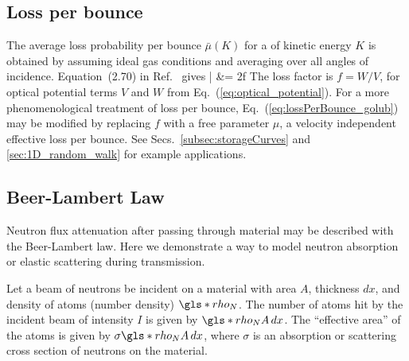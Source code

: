 

\subsection{Loss per bounce}\label{sec:loss_per_bounce}


The average loss probability per bounce $\bar{\mu}(K)$ for a \ucn of kinetic energy $K$ is obtained by assuming ideal gas conditions and averaging over all angles of incidence. Equation~(2.70) in Ref.~\cite{golubUCN} gives
%
\bar{\mu} &= 2f \left[ \frac{V}{K} \sin^{-1}\left( \frac{K}{V}}\right)^{1/2} -\left( \frac{V}{K} - 1 \right)^{1/2} \right]\label{eq:lossPerBounce_golub}
%
The loss factor is $f=W/V$, for optical potential terms $V$ and $W$ from Eq.~(\ref{eq:optical_potential}). For a more phenomenological treatment of loss per bounce, Eq.~(\ref{eq:lossPerBounce_golub}) may be modified by replacing $f$ with a free parameter $\mu$, a velocity independent effective loss per bounce. See Secs.~\ref{subsec:storageCurves} and \ref{sec:1D_random_walk} for example applications.



\subsection{Beer-Lambert Law}\label{sec:beer_lambert_law}


Neutron flux attenuation after passing through material may be described with the Beer-Lambert law. Here we demonstrate a way to model neutron absorption or elastic scattering during transmission.

Let a beam of neutrons be incident on a material with area $A$, thickness $dx$, and density of atoms (number density) $\gls*{rho_N}$. The number of atoms hit by the incident beam of intensity $I$ is given by $\gls*{rho_N} A\,dx$. The ``effective area'' of the atoms is given by $\sigma \gls*{rho_N} A \, dx$, where $\sigma$ is an absorption or scattering cross section of neutrons on the material.

